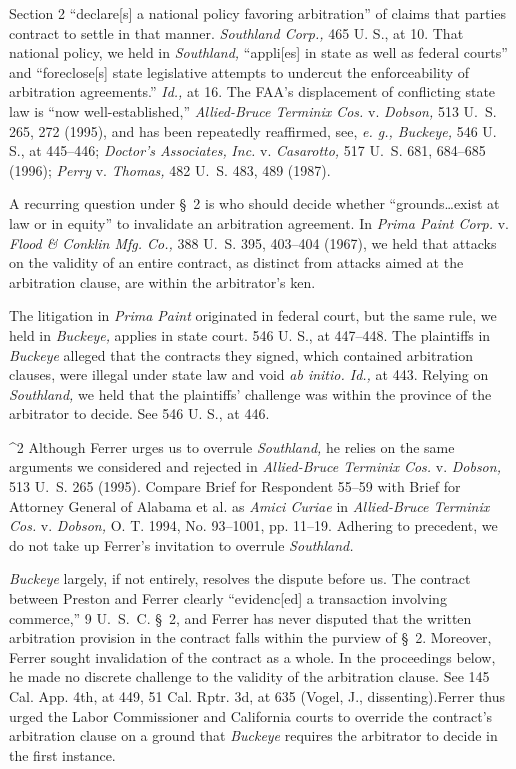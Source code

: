 \noindent Section 2 ``declare[s] a national policy favoring arbitration'' of
claims that parties contract to settle in that manner. \emph{Southland
Corp.,} 465 U. S., at 10. That national policy, we held in
\emph{Southland,} ``appli[es] in state as well as federal courts''
and ``foreclose[s] state legislative attempts to undercut the
enforceability of arbitration agreements.'' \emph{Id.,} at 16.
The FAA's displacement of conflicting state law is ``now
well-established,'' \emph{Allied-Bruce Terminix Cos.} v. \emph{Dobson,} 513
U.~S. 265, 272 (1995), and has been repeatedly reaffirmed, see,
\emph{e. g., Buckeye,} 546 U. S., at 445--446; \emph{Doctor's Associates,}
\emph{Inc.} v. \emph{Casarotto,} 517 U.~S. 681, 684--685 (1996); \emph{Perry}
v. \emph{Thomas,} 482 U.~S. 483, 489 (1987).\footnotemark[2]

  A recurring question under \S~2 is who should decide whether
``grounds\dots exist at law or in equity'' to invalidate an
arbitration agreement. In \emph{Prima Paint Corp.} v. \emph{Flood \&}
\emph{Conklin Mfg. Co.,} 388 U.~S. 395, 403--404 (1967), we held that
attacks on the validity of an entire contract, as distinct from attacks
aimed at the arbitration clause, are within the arbitrator's ken.

  The litigation in \emph{Prima Paint} originated in federal court, but the
same rule, we held in \emph{Buckeye,} applies in state court. 546 U. S.,
at 447--448. The plaintiffs in \emph{Buckeye} alleged that the contracts
they signed, which contained arbitration clauses, were illegal under
state law and void \emph{ab initio. Id.,} at 443. Relying on \emph{Southland,}
we held that the plaintiffs' challenge was within the province of the
arbitrator to decide. See 546 U. S., at 446. \newpage 

^2 Although Ferrer urges us to overrule \emph{Southland,} he relies on the
same arguments we considered and rejected in \emph{Allied-Bruce Terminix
Cos.} v. \emph{Dobson,} 513 U.~S. 265 (1995). Compare Brief for
Respondent 55--59 with Brief for Attorney General of Alabama et al. as
\emph{Amici Curiae} in \emph{Allied-Bruce Terminix Cos.} v. \emph{Dobson,} O. T.
1994, No. 93--1001, pp. 11--19. Adhering to precedent, we do not
take up Ferrer's invitation to overrule \emph{Southland.}

  \emph{Buckeye} largely, if not entirely, resolves the dispute before
us. The contract between Preston and Ferrer clearly ``evidenc[ed] a
transaction involving commerce,'' 9 U.~S.~C. \S~2, and Ferrer
has never disputed that the written arbitration provision in the
contract falls within the purview of \S~2. Moreover, Ferrer sought
invalidation of the contract as a whole. In the proceedings below, he
made no discrete challenge to the validity of the arbitration clause.
See 145 Cal. App. 4th, at 449, 51 Cal. Rptr. 3d, at 635 (Vogel,
J., dissenting).\footnotemark[3] Ferrer thus urged the Labor Commissioner and
California courts to override the contract's arbitration clause on a
ground that \emph{Buckeye} requires the arbitrator to decide in the first
instance.

